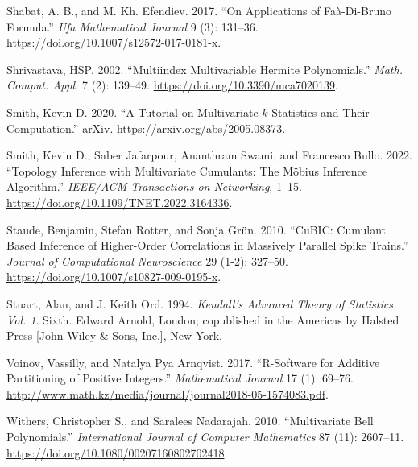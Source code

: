 \begin{CSLReferences}{1}{0}
\leavevmode{}%
Shabat, A. B., and M. Kh. Efendiev. 2017. {``On Applications of {F}aà-Di-{B}runo Formula.''} \emph{Ufa Mathematical Journal} 9 (3): 131--36. \url{https://doi.org/10.1007/s12572-017-0181-x}.

\leavevmode{}%
Shrivastava, HSP. 2002. {``Multiindex Multivariable {H}ermite Polynomials.''} \emph{Math. Comput. Appl.} 7 (2): 139--49. \url{https://doi.org/10.3390/mca7020139}.

\leavevmode{}%
Smith, Kevin D. 2020. {``A Tutorial on Multivariate \(k\)-Statistics and Their Computation.''} arXiv. \url{https://arxiv.org/abs/2005.08373}.

\leavevmode{}%
Smith, Kevin D., Saber Jafarpour, Ananthram Swami, and Francesco Bullo. 2022. {``Topology Inference with Multivariate Cumulants: The Möbius Inference Algorithm.''} \emph{IEEE/ACM Transactions on Networking}, 1--15. \url{https://doi.org/10.1109/TNET.2022.3164336}.

\leavevmode{}%
Staude, Benjamin, Stefan Rotter, and Sonja Grün. 2010. {``Cu{BIC}: Cumulant Based Inference of Higher-Order Correlations in Massively Parallel Spike Trains.''} \emph{Journal of Computational Neuroscience} 29 (1-2): 327--50. \url{https://doi.org/10.1007/s10827-009-0195-x}.

\leavevmode{}%
Stuart, Alan, and J. Keith Ord. 1994. \emph{Kendall's Advanced Theory of Statistics. {V}ol. 1}. Sixth. Edward Arnold, London; copublished in the Americas by Halsted Press {[}John Wiley \& Sons, Inc.{]}, New York.

\leavevmode{}%
Voinov, Vassilly, and Natalya Pya Arnqvist. 2017. {``R-Software for Additive Partitioning of Positive Integers.''} \emph{Mathematical Journal} 17 (1): 69--76. \url{http://www.math.kz/media/journal/journal2018-05-1574083.pdf}.

\leavevmode{}%
Withers, Christopher S., and Saralees Nadarajah. 2010. {``Multivariate {B}ell Polynomials.''} \emph{International Journal of Computer Mathematics} 87 (11): 2607--11. \url{https://doi.org/10.1080/00207160802702418}.

\end{CSLReferences}



